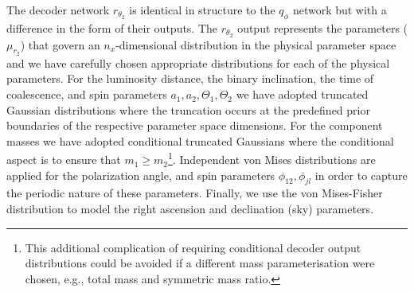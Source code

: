 %
%
The decoder network $r_{\theta_2}$ is identical in structure to the
$q_{\phi}$ network but with a difference in the form of their outputs. The
$r_{\theta_2}$ output represents the parameters ($\mu_{r_2}$) that govern an
$n_x$-dimensional distribution in the physical parameter space and we have
carefully chosen appropriate distributions for each of the physical parameters.
For the luminosity distance, the binary inclination, the time of
coalescence, and spin parameters $a_1,a_2,\Theta_1,\Theta_2$ we have 
adopted truncated Gaussian distributions where the
truncation occurs at the predefined prior boundaries of the respective
parameter space dimensions. For the component masses we have adopted
conditional truncated Gaussians where the conditional aspect is to ensure that
$m_{1}\geq m_{2}$\footnote{This additional complication of requiring conditional
decoder output distributions could be avoided if a different mass
parameterisation were chosen, e.g., total mass and symmetric mass ratio.}. 
Independent von Mises distributions are applied for the polarization angle, 
and spin parameters $\phi_{12},\phi_{jl}$ in order to capture the periodic 
nature of these parameters. Finally, we use the von Mises-Fisher distribution
to model the right ascension and declination (sky) parameters.    

%
%


